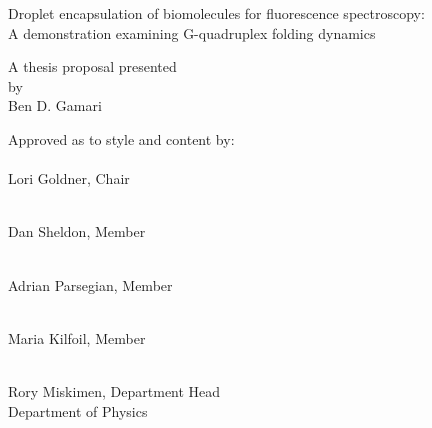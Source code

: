 \begin{center}
\Large{
Droplet encapsulation of biomolecules for fluorescence spectroscopy: \\
A demonstration examining G-quadruplex folding dynamics
}
\end{center}
\vspace{10em}
\begin{center}
A thesis proposal presented \\
by \\
{\sc Ben D. Gamari}
\end{center}
\vspace{10em}

Approved as to style and content by:\\

\makebox[2.5in]{\hrulefill} \\
Lori Goldner, Chair

\makebox[2.5in]{\hrulefill} \\
Dan Sheldon, Member

\makebox[2.5in]{\hrulefill} \\
Adrian Parsegian, Member

\makebox[2.5in]{\hrulefill} \\
Maria Kilfoil, Member

\vspace{10em}
\hspace{20em}
\parbox[t]{3in}{
\makebox[2.5in]{\hrulefill} \\
\hspace{20em} Rory Miskimen, Department Head \\
\hspace{20em} Department of Physics
}